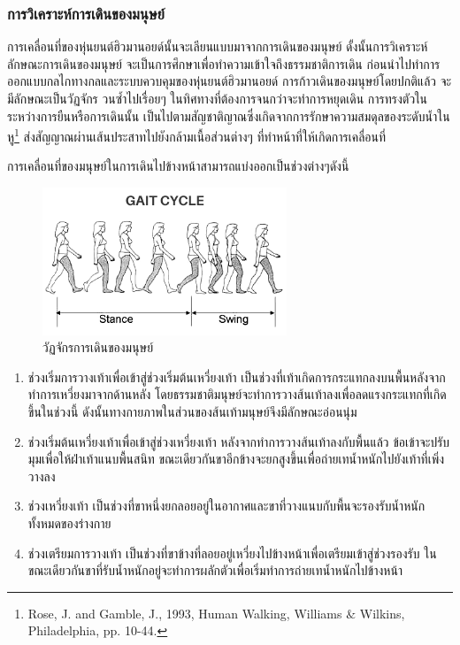 \subsubsection{การวิเคราะห์การเดินของมนุษย์}
การเคลื่อนที่ของหุ่นยนต์ฮิวมานอยด์นั้นจะเลียนแบบมาจากการเดินของมนุษย์
ดั้งนั้นการวิเคราะห์ลักษณะการเดินของมนุษย์ จะเป็นการศึกษาเพื่อทำความเข้าใจถึงธรรมชาติการเดิน
ก่อนนำไปทำการออกแบบกลไกทางกลและระบบควบคุมของหุ่นยนต์ฮิวมานอยด์
การก้าวเดินของมนุษย์โดยปกติแล้ว จะมีลักษณะเป็นวัฏจักร วนซ้ำไปเรื่อยๆ ในทิศทางที่ต้องการจนกว่าจะทำการหยุดเดิน
การทรงตัวในระหว่างการยืนหรือการเดินนั้น เป็นไปตามสัญชาติญาณซึ่งเกิดจากการรักษาความสมดุลของระดับน้ำในหู\footnote{ Rose, J. and Gamble, J., 1993, Human Walking, Williams $\&$  Wilkins, Philadelphia, pp. 10-44. }
ส่งสัญญาณผ่านเส้นประสาทไปยังกล้ามเนื้อส่วนต่างๆ ที่ทำหน้าที่ให้เกิดการเคลื่อนที่

การเคลื่อนที่ของมนุษย์ในการเดินไปข้างหน้าสามารถแบ่งออกเป็นช่วงต่างๆดังนี้
\begin{figure}[ht]
	\centering
	\includegraphics[width=0.65\textwidth]{chapter2/images/gaitcycle.png}
	\caption{วัฏจักรการเดินของมนุษย์}
	\label{fig:human_gait_cycle}
\end{figure}
\begin{enumerate}[label=\arabic*., leftmargin=1.5cm]
	\item ช่วงเริ่มการวางเท้าเพื่อเข้าสู่ช่วงเริ่มต้นเหวี่ยงเท้า เป็นช่วงที่เท้าเกิดการกระแทกลงบนพื้นหลังจากทำการเหวี่ยงมาจากด้านหลัง
	      โดยธรรมชาติมนุษย์จะทำการวางส้นเท้าลงเพื่อลดแรงกระแทกที่เกิดขึ้นในช่วงนี้
	      ดังนั้นทางกายภาพในส่วนของส้นเท้ามนุษย์จึงมีลักษณะอ่อนนุ่ม
	\item ช่วงเริ่มต้นเหวี่ยงเท้าเพื่อเข้าสู่ช่วงเหวี่ยงเท้า หลังจากทำการวางส้นเท้าลงกับพื้นแล้ว ข้อเข้าจะปรับมุมเพื่อให้ฝ่าเท้าแนบพื้นสนิท
	      ขณะเดียวกันขาอีกข้างจะยกสูงขึ้นเพื่อถ่ายเทน้ำหนักไปยังเท้าที่เพิ่งวางลง
	\item ช่วงเหวี่ยงเท้า เป็นช่วงที่ขาหนึ่งยกลอยอยู่ในอากาศและขาที่วางแนบกับพื้นจะรองรับน้ำหนักทั้งหมดของร่างกาย
	\item ช่วงเตรียมการวางเท้า เป็นช่วงที่ขาข้างที่ลอยอยู่เหวี่ยงไปข้างหน้าเพื่อเตรียมเข้าสู่ช่วงรองรับ 
	      ในขณะเดียวกันขาที่รับน้ำหนักอยู่จะทำการผลักตัวเพื่อเริ่มทำการถ่ายเทน้ำหนักไปข้างหน้า
\end{enumerate}

